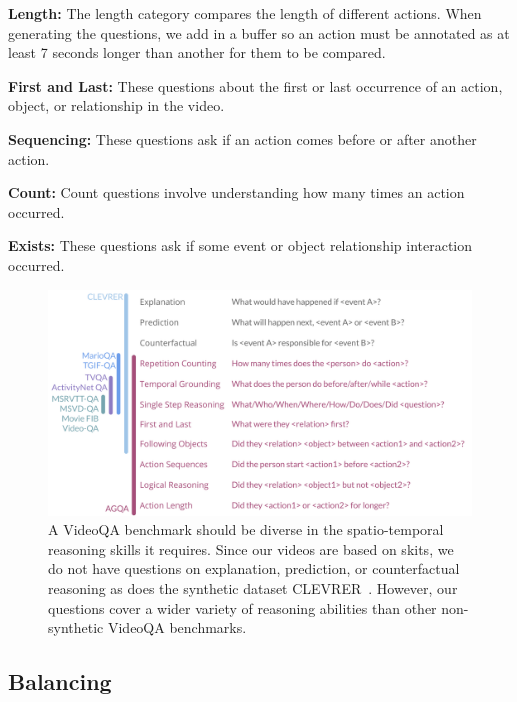\textbf{Length: } The length category compares the length of different actions. When generating the questions, we add in a buffer so an action must be annotated as at least 7 seconds longer than another for them to be compared. %

\textbf{First and Last: } These questions about the first or last occurrence of an action, object, or relationship in the video. 

\textbf{Sequencing: } These questions ask if an action comes before or after another action.

\textbf{Count: } Count questions involve understanding how many times an action occurred.

\textbf{Exists: } These questions ask if some event or object relationship interaction occurred.


\begin{figure}[t]
    \centering
    \includegraphics[width=\columnwidth]{figures/questions.pdf}
    \caption{A VideoQA benchmark should be diverse in the spatio-temporal reasoning skills it requires. Since our videos are based on skits, we do not have questions on explanation, prediction, or counterfactual reasoning as does the synthetic dataset CLEVRER~\cite{yi2019clevrer}. However, our questions cover a wider variety of reasoning abilities than other non-synthetic VideoQA benchmarks.}
    \label{fig:questions}
\end{figure}


\subsection{Balancing}

